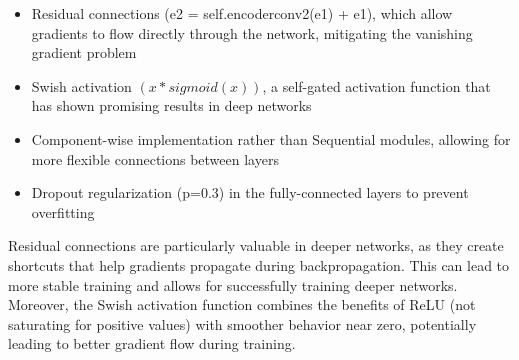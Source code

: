 \documentclass[10pt,letterpaper]{article}
\begin{document}
\begin{itemize}
    \item Residual connections (e2 = self.encoderconv2(e1) + e1), which allow gradients to flow directly through the network, mitigating the vanishing gradient problem
    \item Swish activation $(x * sigmoid(x))$, a self-gated activation function that has shown promising results in deep networks
    \item Component-wise implementation rather than Sequential modules, allowing for more flexible connections between layers
    \item Dropout regularization (p=0.3) in the fully-connected layers to prevent overfitting
\end{itemize}

Residual connections are particularly valuable in deeper networks, as they create shortcuts that help gradients propagate during backpropagation. This can lead to more stable training and allows for successfully training deeper networks. Moreover, the Swish activation function combines the benefits of ReLU (not saturating for positive values) with smoother behavior near zero, potentially leading to better gradient flow during training.
\end{document}
